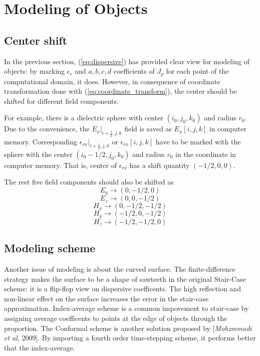 \section{Modeling of Objects}
\label{sec:modeling}

\subsection{Center shift}
In the previous section, (\ref{eq:dispersive}) has provided clear view for modeling of objects: by marking $\epsilon_r$
and $a, b, c,d$ coefficients of $J_p$ for each point of the computational domain, it does. However, in consequence of
coordinate transformation done with (\ref{eq:coordinate_transform}), the center should be shifted for different
field components.

For example, there is a dielectric sphere with center $(i_0,j_0,k_0)$ and radius $r_0$. Due to the convenience, the
$E_x|_{i+\frac{1}{2},j,k}$ field is saved as $E_x[i,j,k]$ in computer memory. Corresponding
$\epsilon_{rx}|_{i+\frac{1}{2},j,k}$ or $\epsilon_{rx}[i,j,k]$ have to be marked with the sphere with the center $(i_0-1/2,
j_0, k_0)$ and radius $r_0$ in the coordinate in computer memory. That is, center of $\epsilon_{rx}$ has a shift
quantity $(-1/2,0,0)$.

The rest five field components should also be shifted as 
\begin{displaymath}
  E_y \rightarrow (0,-1/2,0)
\end{displaymath}
\begin{displaymath}
  E_z \rightarrow (0,0,-1/2)
\end{displaymath}
\begin{displaymath}
  H_x \rightarrow (0,-1/2,-1/2)
\end{displaymath}
\begin{displaymath}
  H_y \rightarrow (-1/2,0,-1/2)
\end{displaymath}
\begin{displaymath}
  H_z \rightarrow (-1/2,-1/2,0)
\end{displaymath}

\subsection{Modeling scheme}
Another issue of modeling is about the curved surface. The finite-difference strategy makes the surface to be a shape of
sawteeth in the original Stair-Case scheme: it is a flip-flop view on dispersive coefficents. The high reflection and
non-linear effect on the surface increases the error in the stair-case approximation. Index-average scheme is a common
impovement to stair-case by assigning average coefficents to points at the edge of objects through the proportion. The
Conformal scheme is another solution proposed by [\textit{Mohzmmadi et al}, 2009]. By importing a fourth order
time-stepping scheme, it performs better that the index-average.

